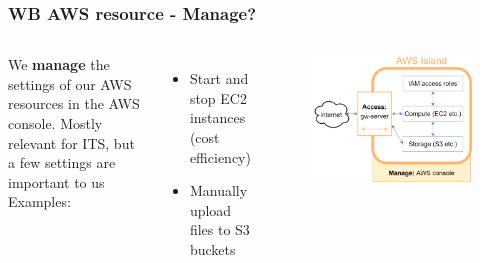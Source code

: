 \documentclass[aspectratio=169]{beamer} %
\begin{document}
\begin{frame}
	\frametitle{WB AWS resource - Manage?}
	\begin{columns}[c]
		We \textbf{manage} the settings of our AWS resources in the AWS console. 
		\vspace{.5cm}\newline
		Mostly relevant for ITS, but a few settings are important to us
		\vspace{.5cm}\newline
		Examples:
		\begin{itemize}
			\item Start and stop EC2 instances (cost efficiency)
			\item Manually upload files to S3 buckets
		\end{itemize}
		
		\begin{figure}
			\centering
			\includegraphics[width=\textwidth]{./img/wb-aws.png}
		\end{figure}
		
	\end{columns}
\end{frame}
\end{document}
